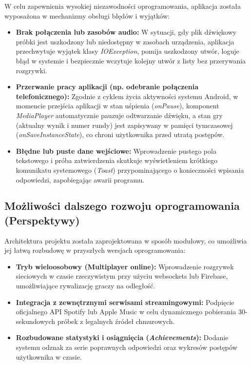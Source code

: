 \hspace{0.60cm}W celu zapewnienia wysokiej niezawodności oprogramowania, aplikacja została wyposażona w mechanizmy obsługi błędów i wyjątków:

\begin{itemize}
    \item \textbf{Brak połączenia lub zasobów audio:} W sytuacji, gdy plik dźwiękowy próbki jest uszkodzony lub niedostępny w zasobach urządzenia, aplikacja przechwytuje wyjątek klasy \textit{IOException}, pomija uszkodzony utwór, loguje błąd w systemie i bezpiecznie wczytuje kolejny utwór z listy bez przerywania rozgrywki.
    \item \textbf{Przerwanie pracy aplikacji (np. odebranie połączenia telefonicznego):} Zgodnie z cyklem życia aktywności systemu Android, w momencie przejścia aplikacji w stan uśpienia (\textit{onPause}), komponent \textit{MediaPlayer} automatycznie pauzuje odtwarzanie dźwięku, a stan gry (aktualny wynik i numer rundy) jest zapisywany w pamięci tymczasowej (\textit{onSaveInstanceState}), co chroni użytkownika przed utratą postępów.
    \item \textbf{Błędne lub puste dane wejściowe:} Wprowadzenie pustego pola tekstowego i próba zatwierdzenia skutkuje wyświetleniem krótkiego komunikatu systemowego (\textit{Toast}) przypominającego o konieczności wpisania odpowiedzi, zapobiegając awarii programu.
\end{itemize}

\subsection{Możliwości dalszego rozwoju oprogramowania (Perspektywy)}

\hspace{0.60cm}Architektura projektu została zaprojektowana w sposób modułowy, co umożliwia jej łatwą rozbudowę w przyszłych wersjach oprogramowania:

\begin{itemize}
    \item \textbf{Tryb wieloosobowy (Multiplayer online):} Wprowadzenie rozgrywek sieciowych w czasie rzeczywistym przy użyciu websockets lub Firebase, umożliwiające rywalizację graczy na odległość.
    \item \textbf{Integracja z zewnętrznymi serwisami streamingowymi:} Podpięcie oficjalnego API Spotify lub Apple Music w celu dynamicznego pobierania 30-sekundowych próbek z legalnych źródeł chmurowych.
    \item \textbf{Rozbudowane statystyki i osiągnięcia (\textit{Achievements}):} Dodanie systemu odznak za serie poprawnych odpowiedzi oraz wykresów postępów użytkownika w czasie.
\end{itemize}

